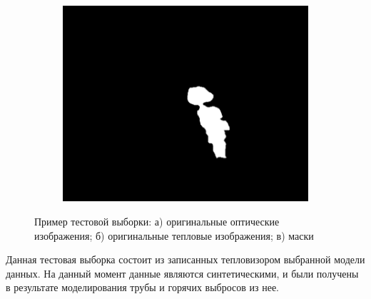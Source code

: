 \documentclass[14pt, a4paper]{extreport}
\begin{document}
\begin{figure}[h!]
\begin{subfigure}{.32\textwidth}
			\includegraphics[width = \textwidth]{image/chapter_3/examples/mask_razmet/159}
			\caption{}
		\end{subfigure}
		\caption{Пример тестовой выборки: а) оригинальные оптические изображения; б) оригинальные тепловые изображения; в) маски}
		\label{fig:test_vib}
	\end{figure}
	
	Данная тестовая выборка состоит из записанных тепловизором выбранной модели данных. На данный момент данные являются синтетическими, и были получены в результате моделирования трубы и горячих выбросов из нее.
	
\end{document}
